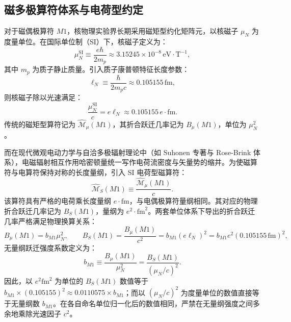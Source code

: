 \subsection{磁多极算符体系与电荷型约定}
对于磁偶极算符 $M1$，核物理实验界长期采用磁矩型约化矩阵元，以核磁子 $\mu_N$ 为度量单位。在国际单位制（SI）下，核磁子定义为：
\begin{equation}\label{eq:appA-mun-def}
\mu_N^{\mathrm{SI}} \equiv \frac{e \hbar}{2 m_p} \approx 3.15245 \times 10^{-8} \, \mathrm{eV} \cdot \mathrm{T}^{-1} ,
\end{equation}
其中 $m_p$ 为质子静止质量。引入质子康普顿特征长度参数：
\begin{equation}\label{eq:appA-ell-n-def}
\ell_N \equiv \frac{\hbar}{2 m_p c} \approx 0.105155 \, \mathrm{fm} ,
\end{equation}
则核磁子除以光速满足：
\begin{equation}\label{eq:appA-mun-over-c}
\frac{\mu_N^{\mathrm{SI}}}{c} = e \ell_N \approx 0.105155 \, e \cdot \mathrm{fm} .
\end{equation}
传统的磁矩型算符记为 $\hat{\mathcal{M}}_\mu(M1)$，其折合跃迁几率记为 $B_\mu(M1)$，单位为 $\mu_N^2$。

而在现代微观电动力学与自洽多极辐射理论中（如 Suhonen 专著与 Rose-Brink 体系），电磁辐射相互作用哈密顿量统一写作电荷流密度与矢量势的缩并。为使磁算符与电算符保持对称的长度量纲，引入 SI 电荷型磁算符：
\begin{equation}\label{eq:appA-ms-def}
\hat{\mathcal{M}}_S(M1) \equiv \frac{\hat{\mathcal{M}}_\mu(M1)}{c} .
\end{equation}
该算符具有严格的电荷乘长度量纲 $e\cdot\mathrm{fm}$，与电偶极算符量纲相同。其对应的物理折合跃迁几率记为 $B_S(M1)$，量纲为 $e^2\cdot\mathrm{fm}^2$。两套单位体系下导出的折合跃迁几率严格满足物理换算关系：
\begin{equation}\label{eq:appA-bs-bmu-trans}
B_\mu(M1) = b_{M1} \mu_N^2 , \qquad
B_S(M1) = \frac{B_\mu(M1)}{c^2} = b_{M1} (e \ell_N)^2 = b_{M1} e^2 (0.105155\,\mathrm{fm})^2 ,
\end{equation}
无量纲跃迁强度系数定义为：
\begin{equation}\label{eq:appA-b-m1-dimensionless}
b_{M1} \equiv \frac{B_\mu(M1)}{\mu_N^2} = \frac{B_S(M1)}{(\mu_N/c)^2} .
\end{equation}
因此，以 $e^2\mathrm{fm}^2$ 为单位的 $B_S(M1)$ 数值等于 $b_{M1} \times (0.105155)^2 \approx 0.0110575 \times b_{M1}$；而以 $(\mu_N/c)^2$ 为度量单位的数值直接等于无量纲数 $b_{M1}$。在各自命名单位归一化后的数值相同，严禁在无量纲强度之间多余地乘除光速因子 $c^2$。

